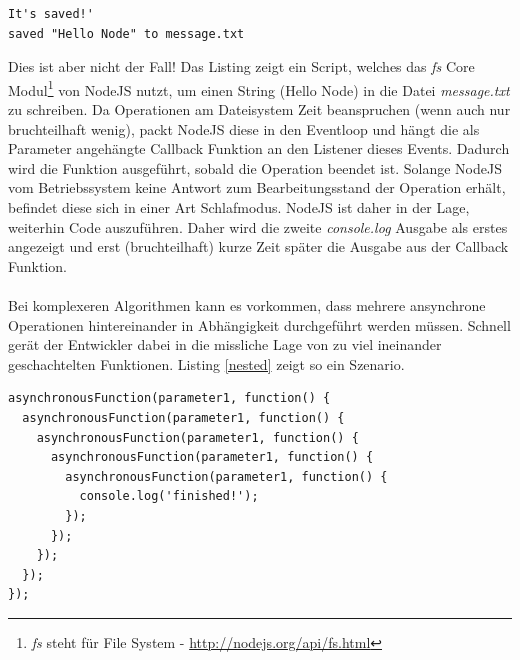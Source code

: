 \begin{verbatim}
It's saved!'
saved "Hello Node" to message.txt
\end{verbatim}

Dies ist aber nicht der Fall! Das Listing zeigt ein Script, welches das \textit{fs} Core Modul\footnote{\textit{fs} steht für File System - \url{http://nodejs.org/api/fs.html}} von NodeJS nutzt, um einen String (\glqq Hello Node\grqq{}) in die Datei \textit{message.txt} zu schreiben. Da Operationen am Dateisystem Zeit beanspruchen (wenn auch nur bruchteilhaft wenig), packt NodeJS diese in den Eventloop und hängt die als Parameter angehängte Callback Funktion an den Listener dieses Events. Dadurch wird die Funktion ausgeführt, sobald die Operation beendet ist. Solange NodeJS vom Betriebssystem keine Antwort zum Bearbeitungsstand der Operation erhält, befindet diese sich in einer Art Schlafmodus. NodeJS ist daher in der Lage, weiterhin Code auszuführen. Daher wird die zweite \textit{console.log} Ausgabe als erstes angezeigt und erst (bruchteilhaft) kurze Zeit später die Ausgabe aus der Callback Funktion.\\
\\
Bei komplexeren Algorithmen kann es vorkommen, dass mehrere ansynchrone Operationen hintereinander in Abhängigkeit durchgeführt werden müssen. Schnell gerät der Entwickler dabei in die missliche Lage von zu viel ineinander geschachtelten Funktionen. Listing \ref{nested} zeigt so ein Szenario.

\vspace{0.6cm}
\begin{lstlisting}[caption=\glqq Pyramid of Doom\grqq{} - Undurchsichtiger und unsauberer Code durch zu viele verschachtelte Funktionen,label=nested]
asynchronousFunction(parameter1, function() {
  asynchronousFunction(parameter1, function() {
    asynchronousFunction(parameter1, function() {
      asynchronousFunction(parameter1, function() {
        asynchronousFunction(parameter1, function() {
          console.log('finished!');
        });
      });
    });
  });
});
\end{lstlisting}


